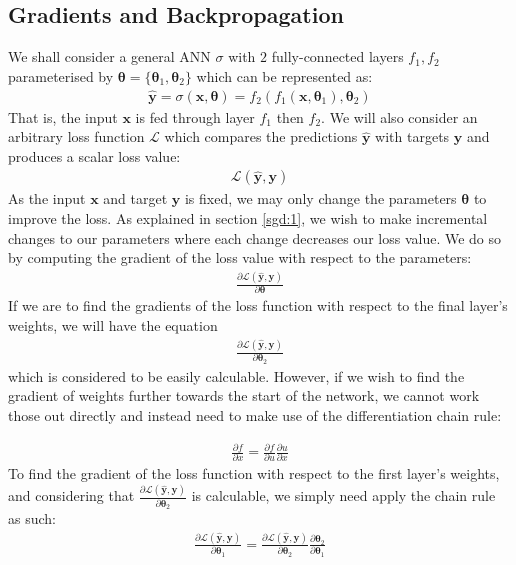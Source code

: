 \documentclass{report}
\begin{document}
\subsection{Gradients and Backpropagation} \label{backprop:1}
We shall consider a general ANN $\sigma$ with $2$ fully-connected layers $f_1, f_2$ parameterised by $\bm{\theta} = \{\bm{\theta}_1, \bm{\theta}_2\}$ which can be represented as:
\begin{align} \label{gradients:1}
 \bm{\hat{y}} = \sigma(\bm{x}, \bm{\theta}) = f_2(f_1(\bm{x},  \bm{\theta}_1), \bm{\theta}_2)
\end{align}
That is, the input $\bm{x}$ is fed through layer $f_1$ then $f_2$. We will also consider an arbitrary loss function $\mathcal{L}$ which compares the predictions $\bm{\hat{y}}$ with targets $\bm{y}$ and produces a scalar loss value:
\begin{align}
 \mathcal{L}(\bm{\hat{y}}, \bm{y})
\end{align}
As the input $\bm{x}$ and target $\bm{y}$ is fixed, we may only change the parameters $\bm{\theta}$ to improve the loss. As explained in section \ref{sgd:1}, we wish to make incremental changes to our parameters where each change decreases our loss value. We do so by computing the gradient of the loss value with respect to the parameters:
\begin{align}
 \frac{\partial\mathcal{L}(\bm{\hat{y}},\bm{y})}
 {\partial\bm{\theta}}
\end{align}
If we are to find the gradients of the loss function with respect to the final layer's weights, we will have the equation
\begin{align}
 \frac{\partial\mathcal{L}(\bm{\hat{y}},\bm{y})}
 {\partial\bm{\theta}_2}
\end{align}
which is considered to be easily calculable. However, if we wish to find the gradient of weights further towards the start of the network, we cannot work those out directly and instead need to make use of the differentiation chain rule: \par
\begin{align}
 \frac{\partial f}{\partial x} = \frac{\partial f}{\partial u} \frac{\partial u}{\partial x}
\end{align}
To find the gradient of the loss function with respect to the first layer's weights, and considering that $\frac{\partial\mathcal{L}(\bm{\hat{y}},\bm{y})}
{\partial\bm{\theta}_2}$ is calculable, we simply need apply the chain rule as such:
\begin{align}
 \frac{\partial\mathcal{L}(\bm{\hat{y}},\bm{y})}{\partial\bm{\theta}_1} =
 \frac{\partial\mathcal{L}(\bm{\hat{y}},\bm{y})}
 {\partial\bm{\theta}_2}
 \frac{\partial\bm{\theta}_2}
 {\partial\bm{\theta}_1}
\end{align}
\end{document}
